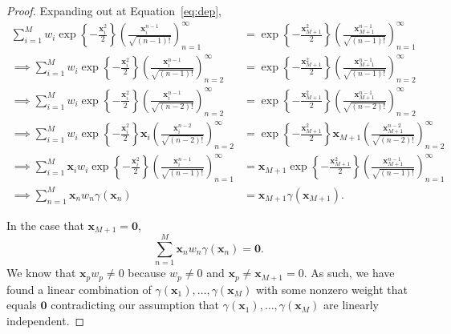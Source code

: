 \begin{proof}
    Expanding out at Equation~\ref{eq:dep},
    \begin{align*}
        \sum_{i = 1}^{M}w_i \exp\left\{-\frac{\mathbf{x}_{i}^2}2 \right\} \left(\frac{ \mathbf{x}_i^{n - 1} }{ \sqrt{(n - 1)!} }\right)_{n=1}^{\infty}
        & =
        \exp\left\{-\frac{\mathbf{x}_{M + 1}^2}2 \right\} \left(\frac{ \mathbf{x}_{M + 1}^{n - 1} }{ \sqrt{(n - 1)!} }\right)_{n=1}^{\infty} \\
        \implies
        \sum_{i = 1}^{M}w_i \exp\left\{-\frac{\mathbf{x}_{i}^2}2 \right\} \left(\frac{ \mathbf{x}_i^{n - 1} }{ \sqrt{(n - 1)!} }\right)_{n=2}^{\infty}
        & =
        \exp\left\{-\frac{\mathbf{x}_{M + 1}^2}2 \right\} \left(\frac{ \mathbf{x}_{M + 1}^{n - 1} }{ \sqrt{(n - 1)!} }\right)_{n=2}^{\infty} \\
        \implies
        \sum_{i = 1}^{M}w_i \exp\left\{-\frac{\mathbf{x}_{i}^2}2 \right\} \left( \frac{ \mathbf{x}_i^{n - 1} }{ \sqrt{(n - 2)!} }\right)_{n=2}^{\infty}
        & =
        \exp\left\{-\frac{\mathbf{x}_{M + 1}^2}2 \right\} \left(\frac{ \mathbf{x}_{M + 1}^{n - 1} }{ \sqrt{(n - 2)!} }\right)_{n=2}^{\infty} \\
        \implies
        \sum_{i = 1}^{M}w_i \exp\left\{-\frac{\mathbf{x}_{i}^2}2 \right\} \mathbf{x}_i \left( \frac{ \mathbf{x}_i^{n - 2} }{ \sqrt{(n - 2)!} }\right)_{n=2}^{\infty}
        & =
        \exp\left\{-\frac{\mathbf{x}_{M + 1}^2}2 \right\} \mathbf{x}_{M + 1}\left(\frac{ \mathbf{x}_{M + 1}^{n - 2} }{ \sqrt{(n - 2)!} }\right)_{n=2}^{\infty} \\
        \implies
        \sum_{i = 1}^{M}\mathbf{x}_i w_i \exp\left\{-\frac{\mathbf{x}_{i}^2}2 \right\} \left( \frac{ \mathbf{x}_i^{n - 1} }{ \sqrt{(n - 1)!} }\right)_{n=1}^{\infty}
        & =
        \mathbf{x}_{M + 1}\exp\left\{-\frac{\mathbf{x}_{M + 1}^2}2 \right\}  \left(\frac{ \mathbf{x}_{M + 1}^{n - 1} }{ \sqrt{(n - 1)!} }\right)_{n=1}^{\infty} \\
        \implies
        \sum\limits_{n=1}^{M} \mathbf{x}_n w_n \gamma(\mathbf{x}_n) & = \mathbf{x}_{M + 1} \gamma(\mathbf{x}_{M + 1}).
    \end{align*}

    In the case that $\mathbf{x}_{M + 1} = \mathbf{0}$,
    \begin{equation*}
        \sum\limits_{n=1}^{M} \mathbf{x}_n w_n \gamma(\mathbf{x}_n) = \mathbf{0}.
    \end{equation*}
    We know that $\mathbf{x}_p w_p \neq 0$ because $w_p \neq 0$ and $\mathbf{x}_p \neq \mathbf{x}_{M + 1} = 0$.
    As such, we have found a linear combination of $\gamma(\mathbf{x}_1), \dots, \gamma(\mathbf{x}_M)$ with some nonzero weight that equals $\mathbf{0}$ contradicting our assumption that $\gamma(\mathbf{x}_1), \dots, \gamma(\mathbf{x}_M)$ are linearly independent.


\end{proof}
